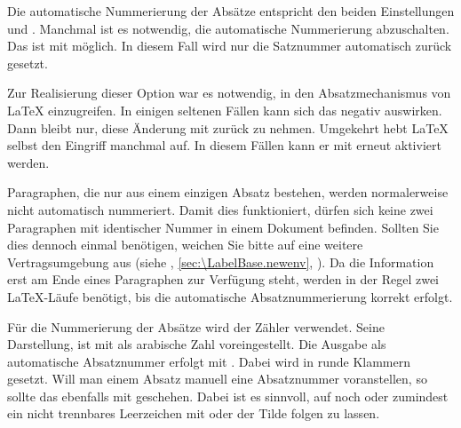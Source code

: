 \begin{Declaration}
\end{Declaration}
Die automatische Nummerierung der Absätze entspricht
den beiden Einstellungen  und
. Manchmal ist es notwendig, die automatische
Nummerierung abzuschalten. Das ist mit %
%
 möglich. In diesem Fall wird nur die
Satznummer automatisch zurück gesetzt.

Zur Realisierung dieser Option war es notwendig, in den Absatzmechanismus von
\LaTeX{} einzugreifen. In einigen seltenen Fällen kann sich das negativ
auswirken. Dann bleibt nur, diese Änderung mit
%
%
 zurück zu nehmen. Umgekehrt hebt
\LaTeX{} selbst den Eingriff manchmal auf. In diesem Fällen kann er mit
%
%
 erneut aktiviert werden.

Paragraphen, die nur aus einem einzigen Absatz bestehen, werden normalerweise
nicht automatisch nummeriert. Damit dies funktioniert, dürfen sich keine zwei
Paragraphen mit identischer Nummer in einem Dokument befinden. Sollten Sie
dies dennoch einmal benötigen, weichen Sie bitte auf eine weitere
Vertragsumgebung aus (siehe
,
\autoref{sec:\LabelBase.newenv},
). Da
die Information erst am Ende eines Paragraphen zur Verfügung steht, werden in
der Regel zwei \LaTeX-Läufe benötigt, bis die automatische Absatznummerierung
korrekt erfolgt.%
\EndIndexGroup

\begin{Declaration}
\end{Declaration}%
Für die Nummerierung der Absätze wird der Zähler 
verwendet. Seine Darstellung,  ist mit
 als arabische Zahl
voreingestellt. Die Ausgabe als automatische
Absatznummer erfolgt mit . Dabei wird  in runde
Klammern gesetzt. Will man einem Absatz manuell eine Absatznummer
voranstellen, so sollte das ebenfalls mit  geschehen. Dabei
ist es sinnvoll, auf  noch  oder
zumindest ein nicht trennbares Leerzeichen mit
 oder der Tilde folgen zu lassen.

